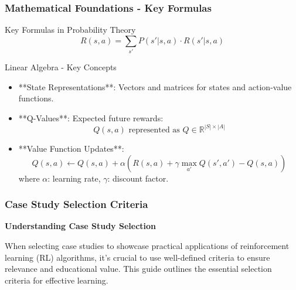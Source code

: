 \documentclass[aspectratio=169]{beamer}
\begin{document}
\begin{frame}[fragile]
    \frametitle{Mathematical Foundations - Key Formulas}
    \begin{block}{Key Formulas in Probability Theory}
        \begin{equation}
            R(s, a) = \sum_{s'} P(s' | s, a) \cdot R(s' | s, a)
        \end{equation}
    \end{block}

    \begin{block}{Linear Algebra - Key Concepts}
        \begin{itemize}
            \item **State Representations**: Vectors and matrices for states and action-value functions.
            \item **Q-Values**: Expected future rewards:
                \[
                Q(s, a) \text{ represented as } Q \in \mathbb{R}^{|S| \times |A|}
                \]
            \item **Value Function Updates**: 
                \[
                Q(s, a) \leftarrow Q(s, a) + \alpha \left( R(s, a) + \gamma \max_{a'} Q(s', a') - Q(s, a) \right)
                \]
                where 
                \(\alpha\): learning rate, \(\gamma\): discount factor.
        \end{itemize}
    \end{block}
\end{frame}

\begin{frame}[fragile]
    \frametitle{Case Study Selection Criteria}
    \textbf{Understanding Case Study Selection}
    
    When selecting case studies to showcase practical applications of reinforcement learning (RL) algorithms, it's crucial to use well-defined criteria to ensure relevance and educational value. This guide outlines the essential selection criteria for effective learning.
\end{frame}
\end{document}
